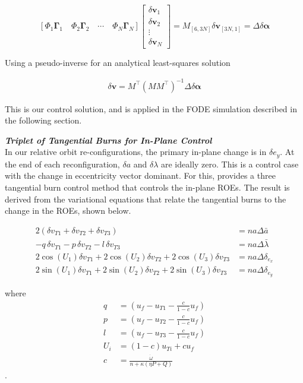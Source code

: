 \begin{equation}
\left[
\Phi_1 \mathbf{\Gamma}_1 \quad
\Phi_2 \mathbf{\Gamma}_2 \quad
\cdots \quad
\Phi_N \mathbf{\Gamma}_N
\right]
\begin{bmatrix}
\delta \mathbf{v}_1 \\
\delta \mathbf{v}_2 \\
\vdots \\
\delta \mathbf{v}_N
\end{bmatrix}
= M_{[6,3N]} \delta \mathbf{v}_{[3N,1]} = \Delta \delta \boldsymbol{\alpha}
\end{equation}

Using a pseudo-inverse for an analytical least-squares solution 

\begin{align}
    \delta \mathbf{v} = M^\top (M M^\top)^{-1} \Delta \delta \boldsymbol{\alpha}
\end{align}

This is our control solution, and is applied in the FODE simulation described in the following section.

\textit{\textbf{Triplet of Tangential Burns for In-Plane Control}}\\

In our relative orbit re-configurations, the primary in-plane change is in $\delta e_y$. At the end of each reconfiguration, $\delta a$ and $\delta \lambda$ are ideally zero. This is a control case with the change in eccentricity vector dominant. For this, \cite{chernick2018new} provides a three tangential burn control method that controls the in-plane ROEs. The result is derived from the variational equations that relate the tangential burns to the change in the ROEs, shown below.

\begin{align}
    2(\delta v_{T1} + \delta v_{T2} + \delta v_{T3}) &= n a \Delta \bar{a} \\
    -q \, \delta v_{T1} - p \, \delta v_{T2} - l \, \delta v_{T3} &= n a \Delta \bar{\lambda} \\
    2 \cos(U_1) \delta v_{T1} + 2 \cos(U_2) \delta v_{T2} + 2 \cos(U_3) \delta v_{T3} &= n a \Delta \delta_{e_x} \\
    2 \sin(U_1) \delta v_{T1} + 2 \sin(U_2) \delta v_{T2} + 2 \sin(U_3) \delta v_{T3} &= n a \Delta \delta_{e_y}
\end{align}

where 
\begin{align}
    q &= \left( u_f - u_{T1} - \frac{c}{1 - c} u_f \right) \\
    p &= \left( u_f - u_{T2} - \frac{c}{1 - c} u_f \right) \\
    l &= \left( u_f - u_{T3} - \frac{c}{1 - c} u_f \right) \\
    U_i &= (1 - c) u_{Ti} + c u_f \\
    c &= \frac{\dot{\omega}}{n + \kappa (\eta P + Q)}
\end{align}.

